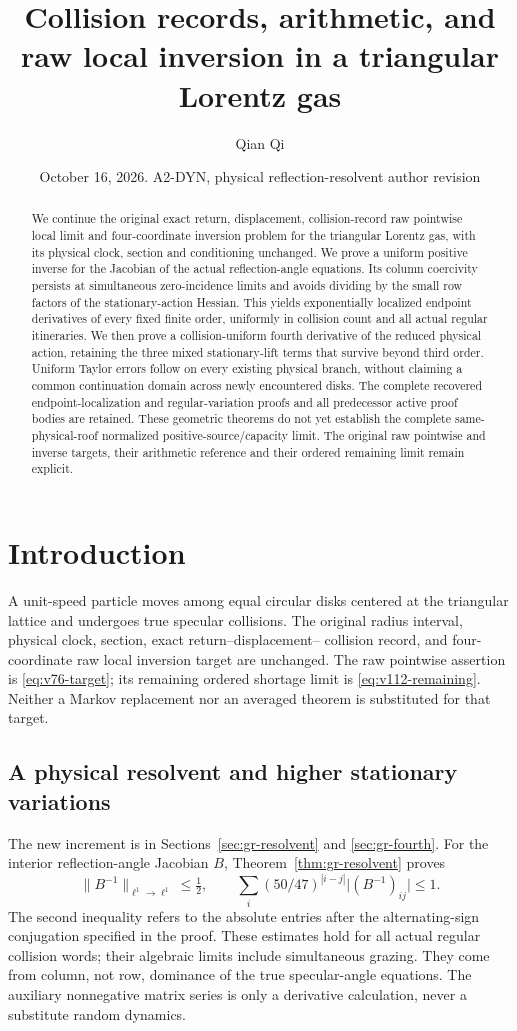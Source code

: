 \documentclass[11pt,reqno]{amsart}
\title[Collision records and raw local inversion]{Collision records, arithmetic, and raw local inversion in a triangular Lorentz gas}
\author{Qian Qi}
\date{October 16, 2026. A2-DYN, physical reflection-resolvent author revision}
\numberwithin{equation}{section}
\theoremstyle{definition}\newtheorem{definition}[theorem]{Definition}
\theoremstyle{remark}\newtheorem{remark}[theorem]{Remark}
\begin{document}
\raggedbottom
\begin{abstract}
We continue the original exact return, displacement, collision-record
raw pointwise local limit and four-coordinate inversion problem for
the triangular Lorentz gas, with its physical clock, section and
conditioning unchanged. We prove a uniform positive inverse for the
Jacobian of the actual reflection-angle equations. Its column
coercivity persists at simultaneous zero-incidence limits and avoids
dividing by the small row factors of the stationary-action Hessian.
This yields exponentially localized endpoint derivatives of every
fixed finite order, uniformly in collision count and all actual
regular itineraries. We then prove a collision-uniform fourth
derivative of the reduced physical action, retaining the three
mixed stationary-lift terms that survive beyond third order.
Uniform Taylor errors follow on every existing physical branch,
without claiming a common continuation domain across newly
encountered disks. The complete recovered endpoint-localization
and regular-variation proofs and all predecessor active proof bodies
are retained. These geometric theorems do not yet establish the
complete same-physical-roof normalized positive-source/capacity
limit. The original raw pointwise and inverse targets, their
arithmetic reference and their ordered remaining limit remain
explicit.
\end{abstract}
\maketitle


\section*{Introduction}
A unit-speed particle moves among equal circular disks centered at the
triangular lattice and undergoes true specular collisions. The original
radius interval, physical clock, section, exact return--displacement--
collision record, and four-coordinate raw local inversion target are
unchanged. The raw pointwise assertion is \eqref{eq:v76-target}; its
remaining ordered shortage limit is \eqref{eq:v112-remaining}. Neither a
Markov replacement nor an averaged theorem is substituted for that target.

\subsection*{A physical resolvent and higher stationary variations}
The new increment is in Sections~\ref{sec:gr-resolvent} and
\ref{sec:gr-fourth}. For the interior reflection-angle Jacobian $B$,
Theorem~\ref{thm:gr-resolvent} proves
\[
 \|B^{-1}\|_{\ell^1\to\ell^1}\le\tfrac12,\qquad
 \sum_i(50/47)^{|i-j|}
    \bigl| (B^{-1})_{ij}\bigr|\le1.
\]
The second inequality refers to the absolute entries after the
alternating-sign conjugation specified in the proof. These
estimates hold for all actual regular collision words; their
algebraic limits include simultaneous grazing. They come from
column, not row, dominance of the true specular-angle equations.
The auxiliary nonnegative matrix series is only a derivative
calculation, never a substitute random dynamics.
\end{document}
